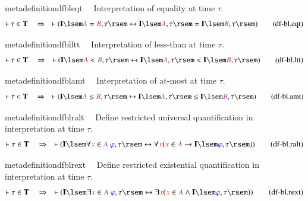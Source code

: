 \begin{restatable}{metadefinition}{dfbleqt}~~ Interpretation of equality at time
$\tau$.
\begin{align}
\vdash \tau \in \mathbf{T}\quad\Rightarrow\quad \vdash ( \mathbf{I} \lsem
    \mc{A} = \mc{B} , \tau \rsem \leftrightarrow \mathbf{I} \lsem \mc{A} , \tau
    \rsem = \mathbf{I} \lsem \mc{B} , \tau \rsem
    )\label{eq:df-bl.eqt}\tag{df-bl.eqt}
\end{align}
\end{restatable}

\begin{restatable}{metadefinition}{dfblltt}~~ Interpretation of less-than at time
$\tau$.
\begin{align}
\vdash \tau \in \mathbf{T}\quad\Rightarrow\quad \vdash ( \mathbf{I} \lsem
    \mc{A} < \mc{B} , \tau \rsem \leftrightarrow \mathbf{I} \lsem \mc{A} , \tau
    \rsem < \mathbf{I} \lsem \mc{B} , \tau \rsem
    )\label{eq:df-bl.ltt}\tag{df-bl.ltt}
\end{align}
\end{restatable}

\begin{restatable}{metadefinition}{dfblamt}~~ Interpretation of at-most at time
$\tau$.
\begin{align}
\vdash \tau \in \mathbf{T}\quad\Rightarrow\quad \vdash ( \mathbf{I} \lsem
    \mc{A} \le \mc{B} , \tau \rsem \leftrightarrow \mathbf{I} \lsem \mc{A} ,
    \tau \rsem \le \mathbf{I} \lsem \mc{B} , \tau \rsem
    )\label{eq:df-bl.amt}\tag{df-bl.amt}
\end{align}
\end{restatable}

\begin{restatable}{metadefinition}{dfblralt}~~ Define restricted universal
quantification in interpretation at time $\tau$.
\begin{align}
\vdash \tau \in \mathbf{T}\quad\Rightarrow\quad \vdash ( \mathbf{I} \lsem
    \forall \msc{x} \in \mc{A}~\mw{\varphi} , \tau \rsem \leftrightarrow
    \forall \msc{x} ( \msc{x} \in \mc{A} \rightarrow \mathbf{I} \lsem
    \mw{\varphi} , \tau \rsem ) )\label{eq:df-bl.ralt}\tag{df-bl.ralt}
\end{align}
\end{restatable}

\begin{restatable}{metadefinition}{dfblrext}~~ Define restricted existential
quantification in interpretation at time $\tau$.
\begin{align}
\vdash \tau \in \mathbf{T}\quad\Rightarrow\quad \vdash ( \mathbf{I} \lsem
    \exists \msc{x} \in \mc{A}~\mw{\varphi} , \tau \rsem \leftrightarrow
    \exists \msc{x} ( \msc{x} \in \mc{A} \wedge \mathbf{I} \lsem \mw{\varphi} ,
    \tau \rsem ) )\label{eq:df-bl.rext}\tag{df-bl.rext}
\end{align}
\end{restatable}

